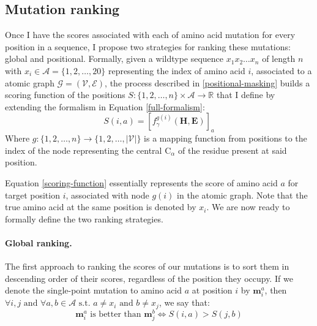\subsection{Mutation ranking}
Once I have the scores associated with each of amino acid mutation for every position in a sequence, I propose two strategies for ranking these mutations: global and positional. Formally, given a wildtype sequence $x_1x_2\dots x_n$ of length $n$ with $x_i \in \mathcal{A} = \{1,2,\dots,20\}$ representing the index of amino acid $i$, associated to a atomic graph $\mathcal{G} = (\mathcal{V}, \mathcal{E})$, the process described in \ref{positional-masking} builds a scoring function of the positions  $S:\{1,2,\dots,n\}\times\mathcal{A}\rightarrow \mathbb{R}$ that I define by extending the formalism in Equation \ref{full-formalism}:
\begin{equation}
    S(i, a) = [f_{\gamma}^{g(i)}(\mathbf{H}, \mathbf{E})]_a
\label{scoring-function}
\end{equation}
Where $g:\{1,2,\dots,n\}\rightarrow\{1,2,\dots,|\mathcal{V}|\}$ is a mapping function from positions to the index of the node representing the central $\text{C}_{\alpha}$ of the residue present at said position. 

Equation \ref{scoring-function} essentially represents the score of amino acid $a$ for target position $i$, associated with node $g(i)$ in the atomic graph. Note that the true amino acid at the same position is denoted by $x_i$. 
We are now ready to formally define the two ranking strategies. 

\paragraph{Global ranking.} The first approach to ranking the scores of our mutations is to sort them in descending order of their scores, regardless of the position they occupy. If we denote the single-point mutation to amino acid $a$ at position $i$ by $\mathbf{m}_{i}^a$, then $\forall i,j\text{ and }\forall a,b\in \mathcal{A} \text{ s.t. } a \neq x_i \text{ and } b \neq x_j$, we say that:
\begin{equation}
    \mathbf{m}_{i}^a\text{ is better than }\mathbf{m}_{j}^b \iff S(i, a) > S(j, b)
\label{global-ranking}
\end{equation}

